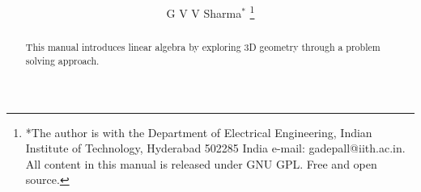 \documentclass[journal,12pt,twocolumn]{IEEEtran}
\renewcommand\thesection{\arabic{section}}
\begin{document}
\let\StandardTheFigure\thefigure
\renewcommand{\thefigure}{\thesection}



\makeatletter
{}
\makeatother

\let\StandardTheFigure\thefigure
\let\StandardTheTable\thetable
\let\vec\mathbf





\def\putbox#1#2#3{\makebox[0in][l]{\makebox[#1][l]{}\raisebox{\baselineskip}[0in][0in]{\raisebox{#2}[0in][0in]{#3}}}}
     \def\rightbox#1{\makebox[0in][r]{#1}}
     \def\centbox#1{\makebox[0in]{#1}}
     \def\topbox#1{\raisebox{-\baselineskip}[0in][0in]{#1}}
     \def\midbox#1{\raisebox{-0.5\baselineskip}[0in][0in]{#1}}

\vspace{3cm}

\title{ 
}

\author{ G V V Sharma$^{*}$%
	\thanks{*The author is with the Department
		of Electrical Engineering, Indian Institute of Technology, Hyderabad
		502285 India e-mail:  gadepall@iith.ac.in. All content in this manual is released under GNU GPL.  Free and open source.}
	
}	

\maketitle

\tableofcontents

\bigskip

\renewcommand{\thefigure}{\theenumi}
\renewcommand{\thetable}{\theenumi}


\begin{abstract}
	
This manual introduces linear algebra by exploring 3D geometry through a problem solving approach.
\end{abstract}
\end{document}
